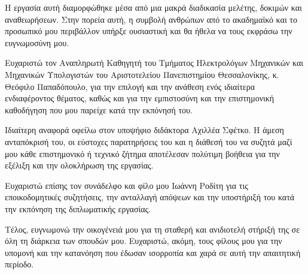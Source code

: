 \noindent Η εργασία αυτή διαμορφώθηκε μέσα από μια μακρά διαδικασία μελέτης, δοκιμών και αναθεωρήσεων. Στην πορεία αυτή, η συμβολή ανθρώπων από το ακαδημαϊκό και το προσωπικό μου περιβάλλον υπήρξε ουσιαστική και θα ήθελα να τους εκφράσω την ευγνωμοσύνη μου.

Ευχαριστώ τον Αναπληρωτή Καθηγητή του Τμήματος Ηλεκτρολόγων Μηχανικών και Μηχανικών Υπολογιστών του Αριστοτελείου Πανεπιστημίου Θεσσαλονίκης, κ. Θεόφιλο Παπαδόπουλο, για την επιλογή και την ανάθεση ενός ιδιαίτερα ενδιαφέροντος θέματος, καθώς και για την εμπιστοσύνη και την επιστημονική καθοδήγηση που μου παρείχε κατά την εκπόνησή του.

Ιδιαίτερη αναφορά οφείλω στον υποψήφιο διδάκτορα Αχιλλέα Σφέτκο. Η άμεση ανταπόκρισή του, οι εύστοχες παρατηρήσεις του και η διάθεσή του να συζητά μαζί μου κάθε επιστημονικό ή τεχνικό ζήτημα αποτέλεσαν πολύτιμη βοήθεια για την εξέλιξη και την ολοκλήρωση της εργασίας.

Ευχαριστώ επίσης τον συνάδελφο και φίλο μου Ιωάννη Ροδίτη για τις εποικοδομητικές συζητήσεις, την ανταλλαγή απόψεων και την υποστήριξή του κατά την εκπόνηση της διπλωματικής εργασίας.

Τέλος, ευγνωμονώ την οικογένειά μου για τη σταθερή και ανιδιοτελή στήριξή της σε όλη τη διάρκεια των σπουδών μου. Ευχαριστώ, ακόμη, τους φίλους μου για την υπομονή και την κατανόηση που έδωσαν ισορροπία και χαρά σε αυτή την απαιτητική περίοδο.

